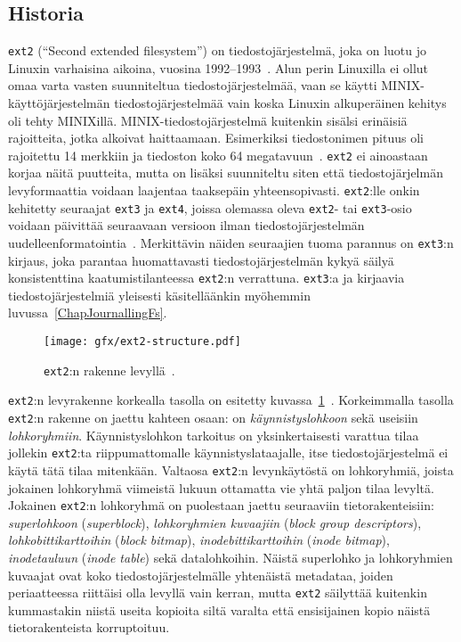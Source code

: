 \subsection{Historia}

\texttt{ext2} (``Second extended filesystem'') on tiedostojärjestelmä,
joka on luotu jo Linuxin varhaisina aikoina, vuosina 1992--1993~\cite{Ext2Design}.
Alun perin Linuxilla ei ollut omaa varta vasten suunniteltua tiedostojärjestelmää,
vaan se käytti MINIX-käyttöjärjestelmän tiedostojärjestelmää vain koska Linuxin alkuperäinen kehitys oli tehty MINIXillä.
MINIX-tiedostojärjestelmä kuitenkin sisälsi erinäisiä rajoitteita,
jotka alkoivat haittaamaan.
Esimerkiksi tiedostonimen pituus oli rajoitettu 14 merkkiin ja tiedoston koko 64 megatavuun~\cite{Ext2Design}.
\texttt{ext2} ei ainoastaan korjaa näitä puutteita,
mutta on lisäksi suunniteltu siten että tiedostojärjelmän levyformaattia voidaan laajentaa taaksepäin yhteensopivasti.
\texttt{ext2}:lle onkin kehitetty seuraajat \texttt{ext3} ja \texttt{ext4}, joissa olemassa oleva \texttt{ext2}- tai \texttt{ext3}-osio voidaan päivittää seuraavaan
versioon ilman tiedostojärjestelmän uudelleenformatointia~\cite{Ext4Status}.
Merkittävin näiden seuraajien tuoma parannus on \texttt{ext3}:n kirjaus,
joka parantaa huomattavasti tiedostojärjestelmän kykyä säilyä konsistenttina kaatumistilanteessa \texttt{ext2}:n verrattuna.
\texttt{ext3}:a ja kirjaavia tiedostojärjestelmiä yleisesti käsitelläänkin myöhemmin luvussa~\ref{ChapJournallingFs}.

\begin{figure}
    \centering
    \texttt{[image: gfx/ext2-structure.pdf]}
    \caption{\texttt{ext2}:n rakenne levyllä~\cite{LinuxKernelBook}.}
    \label{FigExt2DiskFormat}
\end{figure}

\texttt{ext2}:n levyrakenne korkealla tasolla on esitetty kuvassa~\ref{FigExt2DiskFormat}~\cite{LinuxKernelBook}.
Korkeimmalla tasolla \texttt{ext2}:n rakenne on jaettu kahteen osaan: on \emph{käynnistyslohkoon} sekä useisiin \emph{lohkoryhmiin}.
Käynnistyslohkon tarkoitus on yksinkertaisesti varattua tilaa jollekin \texttt{ext2}:ta riippumattomalle käynnistyslataajalle,
itse tiedostojärjestelmä ei käytä tätä tilaa mitenkään.
Valtaosa \texttt{ext2}:n levynkäytöstä on lohkoryhmiä,
joista jokainen lohkoryhmä viimeistä lukuun ottamatta vie yhtä paljon tilaa levyltä.
Jokainen \texttt{ext2}:n lohkoryhmä on puolestaan jaettu seuraaviin tietorakenteisiin:
\emph{superlohkoon} (\emph{superblock}),
\emph{lohkoryhmien kuvaajiin} (\emph{block group descriptors}),
\emph{lohkobittikarttoihin} (\emph{block bitmap}),
\emph{inodebittikarttoihin} (\emph{inode bitmap}),
\emph{inodetauluun} (\emph{inode table}) sekä datalohkoihin.
Näistä superlohko ja lohkoryhmien kuvaajat ovat koko tiedostojärjestelmälle yhtenäistä metadataa,
joiden periaatteessa riittäisi olla levyllä vain kerran,
mutta \texttt{ext2} säilyttää kuitenkin kummastakin niistä useita kopioita siltä varalta että ensisijainen kopio näistä tietorakenteista korruptoituu.

